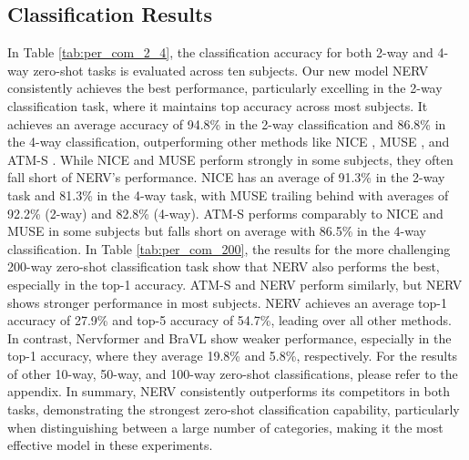 \documentclass{article}
\begin{document}
\subsection{Classification Results}
In Table \ref{tab:per_com_2_4}, the classification accuracy for both 2-way and 4-way zero-shot tasks is evaluated across ten subjects. Our new model NERV consistently achieves the best performance, particularly excelling in the 2-way classification task, where it maintains top accuracy across most subjects. It achieves an average accuracy of 94.8\% in the 2-way classification and 86.8\% in the 4-way classification, outperforming other methods like NICE \cite{nice_2023}, MUSE \cite{muse_2024}, and ATM-S \cite{atm_2024}. While NICE and MUSE perform strongly in some subjects, they often fall short of NERV's performance. NICE has an average of 91.3\% in the 2-way task and 81.3\% in the 4-way task, with MUSE trailing behind with averages of 92.2\% (2-way) and 82.8\% (4-way). ATM-S performs comparably to NICE and MUSE in some subjects but falls short on average with 86.5\% in the 4-way classification. In Table \ref{tab:per_com_200}, the results for the more challenging 200-way zero-shot classification task show that NERV also performs the best, especially in the top-1 accuracy. ATM-S and NERV perform similarly, but NERV shows stronger performance in most subjects. NERV achieves an average top-1 accuracy of 27.9\% and top-5 accuracy of 54.7\%, leading over all other methods. In contrast, Nervformer \cite{muse_2024} and BraVL \cite{du2023decoding} show weaker performance, especially in the top-1 accuracy, where they average 19.8\% and 5.8\%, respectively. For the results of other 10-way, 50-way, and 100-way zero-shot classifications, please refer to the appendix. In summary, NERV consistently outperforms its competitors in both tasks, demonstrating the strongest zero-shot classification capability, particularly when distinguishing between a large number of categories, making it the most effective model in these experiments.
\end{document}
